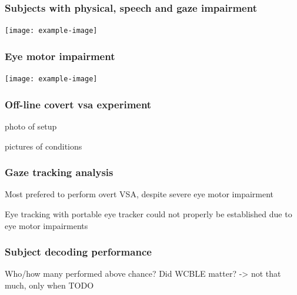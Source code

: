 \documentclass{kul-ulille-beamer}
\begin{document}

\begin{frame}
  \frametitle{Subjects with physical, speech and gaze impairment}
  \centering
  \texttt{[image: example-image]}
\end{frame}

\begin{frame}
  \frametitle{Eye motor impairment}
  \centering
  \texttt{[image: example-image]}
\end{frame}

\begin{frame}
  \frametitle{Off-line covert vsa experiment}
  photo of setup

  pictures of conditions

\end{frame}

\begin{frame}
  \frametitle{Gaze tracking analysis}
  Most prefered to perform overt VSA, despite severe eye motor impairment

  Eye tracking  with portable eye tracker could not properly be established due
  to eye motor impairments
\end{frame}

\begin{frame}
  \frametitle{Subject decoding performance}
  Who/how many performed above chance?
  Did WCBLE matter? -> not that much, only when TODO
\end{frame}
\end{document}
